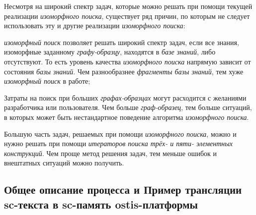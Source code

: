 Несмотря на широкий спектр задач, которые можно решать при помощи текущей реализации \textit{изоморфного поиска}, существует ряд причин, по которым не следует использовать эту и другие реализации \textit{изоморфного поиска}:
\begin{textitemize}
	\item \textit{изоморфный поиск} позволяет решать широкий спектр задач, если все знания, изоморфные заданному \textit{графу-образцу}, находятся в \textit{базе знаний}, либо отсутствуют. То есть уровень качества \textit{изоморфного поиска} напрямую зависит от состояния \textit{базы знаний}. Чем разнообразнее \textit{фрагменты базы знаний}, тем хуже \textit{изоморфный поиск} в работе;
	\item Затраты на поиск при больших \textit{графах-образцах} могут расходится с желаниями разработчика или пользователя. Чем больше \textit{граф-образец}, тем больше ситуаций, в которых может быть нестандартное поведение алгоритма \textit{изоморфного поиска}.
	\item Большую часть задач, решаемых при помощи \textit{изоморфного поиска}, можно и нужно решать при помощи \textit{итераторов поиска трёх- и пяти- элементных конструкций}. Чем проще метод решения задач, тем меньше ошибок и внештатных ситуаций можно получить.
\end{textitemize}	

\subsection{Общее описание процесса и Пример трансляции sc-текста в sc-память ostis-платформы}
\label{sec_soft_platform_scin_code_example}

